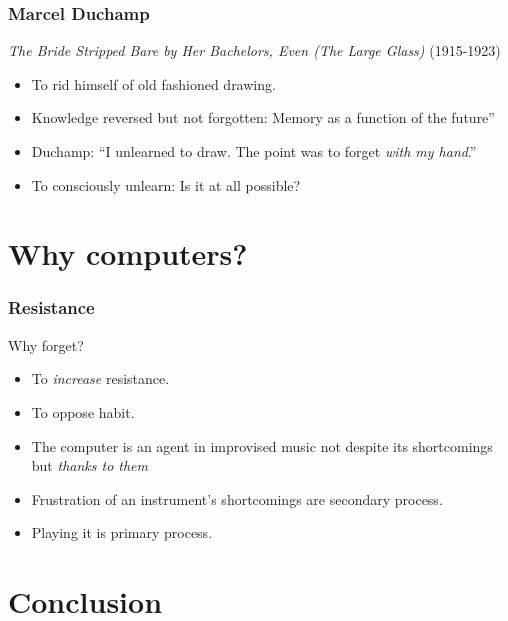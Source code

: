 \documentclass{beamer}
\begin{document}
\begin{frame}
  \frametitle{Marcel Duchamp}
  \begin{block}{\emph{The Bride Stripped Bare by Her Bachelors, Even
        (The Large Glass)} (1915-1923)}
    \begin{itemize}
    \item<1-> To rid himself of old fashioned drawing.
    \item<2-> Knowledge reversed but not forgotten: Memory as a function of the future''
    \item<3-> Duchamp: ``I unlearned to draw. The point was to forget
      \emph{with my hand}.''
    \item<4-> To consciously unlearn: Is it at all possible?
    \end{itemize}
  \end{block}
\end{frame}

\section{Why computers?}

\begin{frame}
  \frametitle{Resistance}
  \begin{block}{Why forget?}
    \begin{itemize}
    \item<1-> To \emph{increase} resistance.
    \item<2-> To oppose habit.
    \item<3-> The computer is an agent in improvised music not despite its shortcomings but \emph{thanks to them}
    \item<4-> Frustration of an instrument's shortcomings are secondary process. 
    \item<5-> Playing it is primary process.
    \end{itemize}
  \end{block}
\end{frame}

\section{Conclusion}
\end{document}
